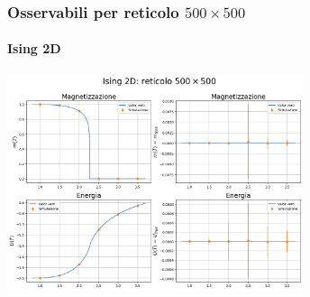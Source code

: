 \begin{frame}
    \frametitle{Osservabili per reticolo $500 \times 500$}
    \framesubtitle{Ising 2D}

    \centering
    \includegraphics[width=0.65\textwidth]{Immagini/backupIsing2D/obs_500.png}

\end{frame}
